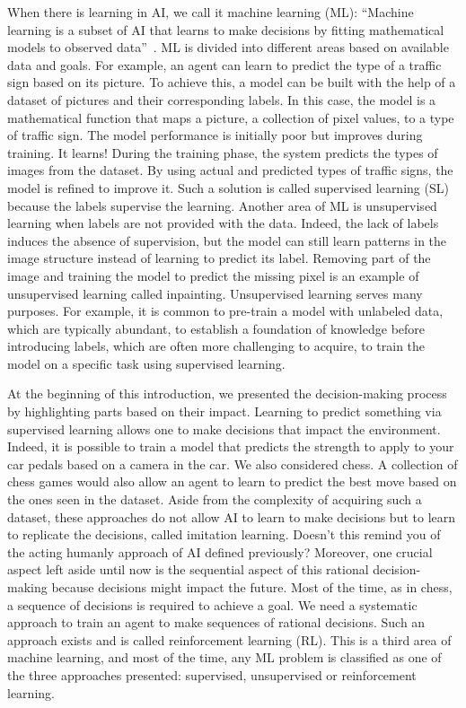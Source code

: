 When there is learning in AI, we call it machine learning (ML): ``Machine learning is a subset of AI that learns to make decisions by fitting mathematical models to observed data''~\citep{prince2023understanding}.
ML is divided into different areas based on available data and goals.
For example, an agent can learn to predict the type of a traffic sign based on its picture.
To achieve this, a model can be built with the help of a dataset of pictures and their corresponding labels.
In this case, the model is a mathematical function that maps a picture, a collection of pixel values, to a type of traffic sign.
The model performance is initially poor but improves during training. 
It learns!
During the training phase, the system predicts the types of images from the dataset.
By using actual and predicted types of traffic signs, the model is refined to improve it.
Such a solution is called supervised learning (SL) because the labels supervise the learning.
Another area of ML is unsupervised learning when labels are not provided with the data.
Indeed, the lack of labels induces the absence of supervision, but the model can still learn patterns in the image structure instead of learning to predict its label.
Removing part of the image and training the model to predict the missing pixel is an example of unsupervised learning called inpainting.
Unsupervised learning serves many purposes.
For example, it is common to pre-train a model with unlabeled data, which are typically abundant, to establish a foundation of knowledge before introducing labels, which are often more challenging to acquire, to train the model on a specific task using supervised learning.

At the beginning of this introduction, we presented the decision-making process by highlighting parts based on their impact.
Learning to predict something via supervised learning allows one to make decisions that impact the environment.
Indeed, it is possible to train a model that predicts the strength to apply to your car pedals based on a camera in the car.
We also considered chess.
A collection of chess games would also allow an agent to learn to predict the best move based on the ones seen in the dataset.
Aside from the complexity of acquiring such a dataset, these approaches do not allow AI to learn to make decisions but to learn to replicate the decisions, called imitation learning.
Doesn't this remind you of the acting humanly approach of AI defined previously?
Moreover, one crucial aspect left aside until now is the sequential aspect of this rational decision-making because decisions might impact the future.
Most of the time, as in chess, a sequence of decisions is required to achieve a goal.
We need a systematic approach to train an agent to make sequences of rational decisions.
Such an approach exists and is called reinforcement learning (RL).
This is a third area of machine learning, and most of the time, any ML problem is classified as one of the three approaches presented: supervised, unsupervised or reinforcement learning.


